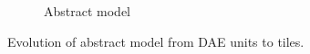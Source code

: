 \begin{figure}[h]
\begin{center}
\begin{subfigure}[b]{0.190\textwidth}
		\caption{Abstract model}
		\label{fig:abstract_model}
	\end{subfigure}
	\caption{Evolution of abstract model from DAE units to tiles.}
	\label{fig:evolution}
\end{center}
\end{figure}
